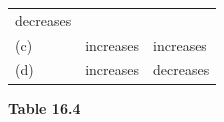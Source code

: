 \begin{enumerate}[noitemsep, label=\textbf{\arabic*}. ]
\begin{enumerate}[noitemsep, label=\textbf{\alph*}. ]
{{\begin{center}
\begin{xtabular}[t]{|l|l|l|}
        decreases%
     \tabularnewline{}
    
    
        (c) &
    
    
        increases &
    
    
        increases%
     \tabularnewline{}
    
    
        (d) &
    
    
        increases &
    
    
        decreases%
     \tabularnewline{}
    \end{xtabular}
      \end{center}
    \begin{center}{\small\bfseries Table 16.4}\end{center}
    
}}
\end{enumerate}
\end{enumerate}
